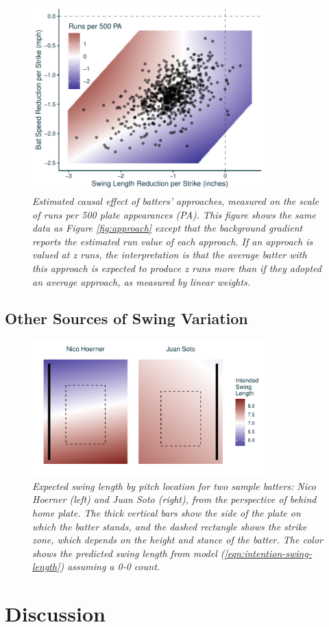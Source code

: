 \documentclass{article}
\begin{document}
      \begin{figure}
        \centering
        \includegraphics[width = 0.8\textwidth]{../../figures/approach_run_value.pdf}
        \caption{\it Estimated causal effect of batters' approaches, measured on the scale of runs per 500 plate appearances (PA). This figure shows the same data as Figure \ref{fig:approach} except that the background gradient reports the estimated run value of each approach. If an approach is valued at z runs, the interpretation is that the average batter with this approach is expected to produce z runs more than if they adopted an average approach, as measured by linear weights.}
        \label{fig:approach-run-value}
      \end{figure}

    \subsection{Other Sources of Swing Variation}
    \label{sec:results-other}

      \begin{figure}
        \centering
        \includegraphics[width = 0.8\textwidth]{../../figures/adaptation.pdf}
        \caption{\it Expected swing length by pitch location for two sample batters: Nico Hoerner (left) and Juan Soto (right), from the perspective of behind home plate. The thick vertical bars show the side of the plate on which the batter stands, and the dashed rectangle shows the strike zone, which depends on the height and stance of the batter. The color shows the predicted swing length  from model (\ref{eqn:intention-swing-length}) assuming a 0-0 count.}
        \label{fig:adaptation}
      \end{figure}

  \section{Discussion}
  \label{sec:discussion}

  
\end{document}
